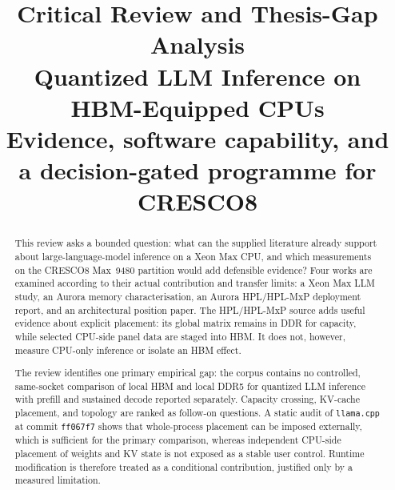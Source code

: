 \documentclass[11pt,a4paper]{article}
\title{\textbf{Critical Review and Thesis-Gap Analysis}\\[5pt]
       \Large Quantized LLM Inference on HBM-Equipped CPUs\\[3pt]
       \large Evidence, software capability, and a decision-gated
       programme for CRESCO8}
\author{}
\date{}
\newcommand{\lcpp}{\texttt{llama.cpp}}
\newcommand{\commitshort}{\texttt{ff067f7}}
\begin{document}
\maketitle

\nocite{dongarra2026gpus, fang2025kvplacement, goto2026aurorahpl,
        ibeid2025aurora, jang2026itme, na2024llmcpu,
        williams2009roofline, zhang2026cacheresident}
\nocite{llamacpp2026}

\begin{abstract}
\noindent
This review asks a bounded question: what can the supplied literature
already support about large-language-model inference on a Xeon Max CPU,
and which measurements on the CRESCO8 Max~9480 partition would add
defensible evidence?  Four works are examined according to their actual
contribution and transfer limits: a Xeon Max LLM study, an Aurora memory
characterisation, an Aurora HPL/HPL-MxP deployment report, and an
architectural position paper.  The HPL/HPL-MxP source adds
useful evidence about explicit placement: its global matrix remains in
DDR for capacity, while selected CPU-side panel data are staged into HBM.
It does not, however, measure CPU-only inference or isolate an HBM effect.

The review identifies one primary empirical gap: the corpus contains no
controlled, same-socket comparison of local HBM and local DDR5 for
quantized LLM inference with prefill and sustained decode reported
separately.  Capacity crossing, KV-cache placement, and topology are
ranked as follow-on questions.  A static audit of \lcpp{} at commit
\commitshort{} shows that whole-process placement can be imposed
externally, which is sufficient for the primary comparison, whereas
independent CPU-side placement of weights and KV state is not exposed as
a stable user control.  Runtime modification is therefore treated as a
conditional contribution, justified only by a measured limitation.
\end{abstract}

\tableofcontents

\clearpage


\clearpage


\clearpage


\clearpage


\clearpage


\clearpage


\clearpage


\end{document}
